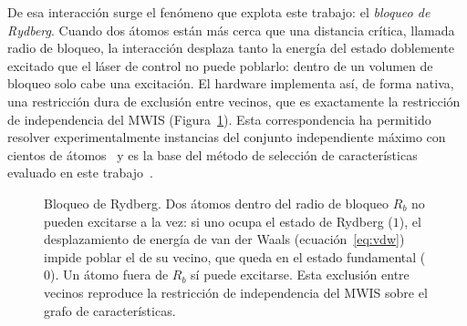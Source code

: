 De esa interacción surge el fenómeno que explota este trabajo: el
\emph{bloqueo de Rydberg}. Cuando dos átomos están más cerca que una
distancia crítica, llamada radio de bloqueo, la interacción desplaza
tanto la energía del estado doblemente excitado que el láser de
control no puede poblarlo: dentro de un volumen de bloqueo solo cabe
una excitación. El hardware implementa así, de forma nativa, una
restricción dura de exclusión entre vecinos, que es exactamente la
restricción de independencia del MWIS (Figura~\ref{fig:rydberg-esquema}).
Esta correspondencia ha
permitido resolver experimentalmente instancias del conjunto
independiente máximo con cientos de átomos~\cite{ebadi2022} y es la
base del método de selección de características evaluado en este
trabajo~\cite{orquin2026}.

\begin{figure}[!htbp]
  \centering
  \caption[Bloqueo de Rydberg]{Bloqueo de Rydberg. Dos átomos dentro
    del radio de bloqueo
    $R_b$ no pueden excitarse a la vez: si uno ocupa el estado de Rydberg
    ($1$), el desplazamiento de energía de van der Waals
    (ecuación~\ref{eq:vdw}) impide poblar el de su vecino, que queda en el
    estado fundamental ($0$). Un átomo fuera de $R_b$ sí puede excitarse.
    Esta exclusión entre vecinos reproduce la restricción de
    independencia del MWIS sobre el grafo de características.}
  \label{fig:rydberg-esquema}
\end{figure}

